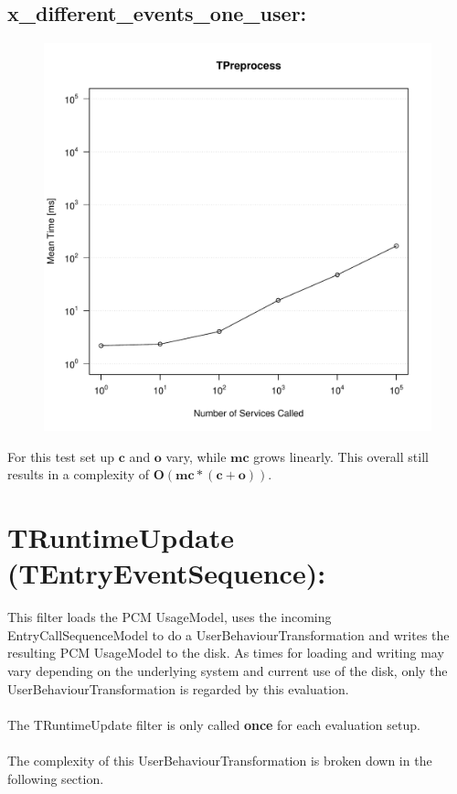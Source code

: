 \documentclass[10pt,a4paper]{article}
\begin{document}
\subsection{x\_different\_events\_one\_user:}
\begin{figure}[H]
	\centering
	\includegraphics[scale=0.7]{Grafiken/TPreprocess_different_events_ms.pdf}
\end{figure}
For this test set up $\mathbf{c}$ and $\mathbf{o}$ vary, while $\mathbf{mc}$ grows linearly. This overall still results in a complexity of $\mathbf{O(mc * (c + o))}$.

\section{TRuntimeUpdate (TEntryEventSequence):}
This filter loads the PCM UsageModel, uses the incoming EntryCallSequenceModel to do a UserBehaviourTransformation and writes the resulting PCM UsageModel to the disk. As times for loading and writing may vary depending on the underlying system and current use of the disk, only the UserBehaviourTransformation is regarded by this evaluation.\\
\\
The TRuntimeUpdate filter is only called \textbf{once} for each evaluation setup.\\
\\
The complexity of this UserBehaviourTransformation is broken down in the following section.
\end{document}
